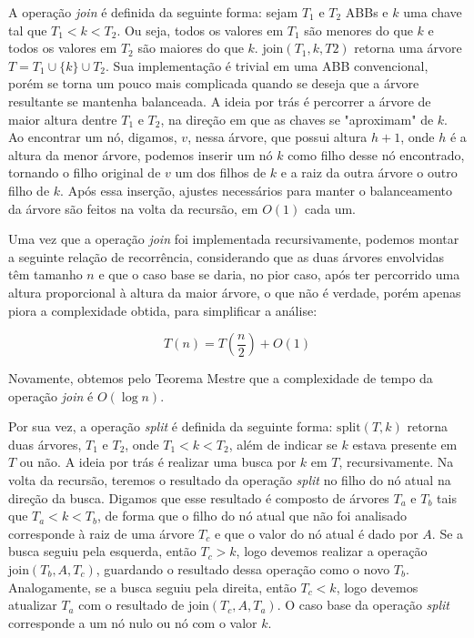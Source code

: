 \documentclass[a4paper,12pt]{report}
\begin{document}
A operação \textit{join} é definida da seguinte forma: sejam $T_1$ e $T_2$ ABBs e $k$ uma 
chave tal que $T_1 < k < T_2$. Ou seja, todos os valores em $T_1$ são menores do que $k$ 
e todos os valores em $T_2$ são maiores do que $k$. $\textrm{join}(T_1, k, T2)$ retorna uma 
árvore $T = T_1 \cup \{k\} \cup T_2$. Sua implementação é trivial em uma ABB convencional, 
porém se torna um pouco mais complicada quando se deseja que a árvore resultante se mantenha 
balanceada. A ideia por trás é percorrer a árvore de maior altura dentre $T_1$ e $T_2$, na 
direção em que as chaves se "aproximam" de $k$. Ao encontrar um nó, digamos, $v$, nessa árvore,
que possui altura $h + 1$, onde $h$ é a altura da menor árvore, podemos inserir um nó $k$ 
como filho desse nó encontrado, tornando o filho original de $v$ um dos filhos de $k$ e a 
raiz da outra árvore o outro filho de $k$. Após essa inserção, ajustes necessários para 
manter o balanceamento da árvore são feitos na volta da recursão, em $O(1)$ cada um.

Uma vez que a operação \textit{join} foi implementada recursivamente, podemos montar a seguinte 
relação de recorrência, considerando que as duas árvores envolvidas têm tamanho $n$ e que o
caso base se daria, no pior caso, após ter percorrido uma altura proporcional à altura da 
maior árvore, o que não é verdade, porém apenas piora a complexidade obtida, para simplificar 
a análise:

\[
                               T(n) = T\left(\frac{n}{2}\right) + O(1)
\]

Novamente, obtemos pelo Teorema Mestre que a complexidade de tempo da operação \textit{join} é 
$O(\log n)$.

Por sua vez, a operação \textit{split} é definida da seguinte forma: $\textrm{split}(T, k)$ 
retorna duas árvores, $T_1$ e $T_2$, onde $T_1 < k < T_2$, além de indicar se $k$ estava presente 
em $T$ ou não. A ideia por trás é realizar uma busca por $k$ em $T$, recursivamente. Na volta da 
recursão, teremos o resultado da operação \textit{split} no filho do nó atual na direção da busca. 
Digamos que esse resultado é composto de árvores $T_a$ e $T_b$ tais que $T_a < k < T_b$, de forma 
que o filho do nó atual que não foi analisado corresponde à raiz de uma árvore $T_c$ e que o valor 
do nó atual é dado por $A$. Se a busca seguiu pela esquerda, então $T_c > k$, logo devemos realizar 
a operação $\textrm{join}(T_b, A, T_c)$, guardando o resultado dessa operação como o novo $T_b$. 
Analogamente, se a busca seguiu pela direita, então $T_c < k$, logo devemos atualizar $T_a$ com o 
resultado de $\textrm{join}(T_c, A, T_a)$. O caso base da operação \textit{split} corresponde a um 
nó nulo ou nó com o valor $k$.
\end{document}

